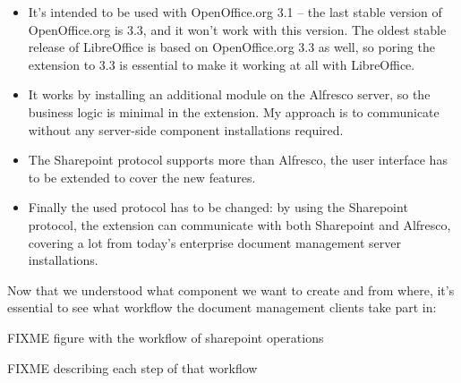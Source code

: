 \begin{itemize}
\item It's intended to be used with OpenOffice.org 3.1 -- the last stable
version of OpenOffice.org is 3.3, and it won't work with this version. The
oldest stable release of LibreOffice is based on OpenOffice.org 3.3 as well, so
poring the extension to 3.3 is essential to make it working at all with
LibreOffice.
\item It works by installing an additional module on the Alfresco server, so
the business logic is minimal in the extension. My approach is to communicate
without any server-side component installations required.
\item The Sharepoint protocol supports more than Alfresco, the user interface
has to be extended to cover the new features.
\item Finally the used protocol has to be changed: by using the Sharepoint
protocol, the extension can communicate with both Sharepoint and Alfresco,
covering a lot from today's enterprise document management server
installations.
\end{itemize}

Now that we understood what component we want to create and from where, it's
essential to see what workflow the document management clients take part in:

FIXME figure with the workflow of sharepoint operations

FIXME describing each step of that workflow
